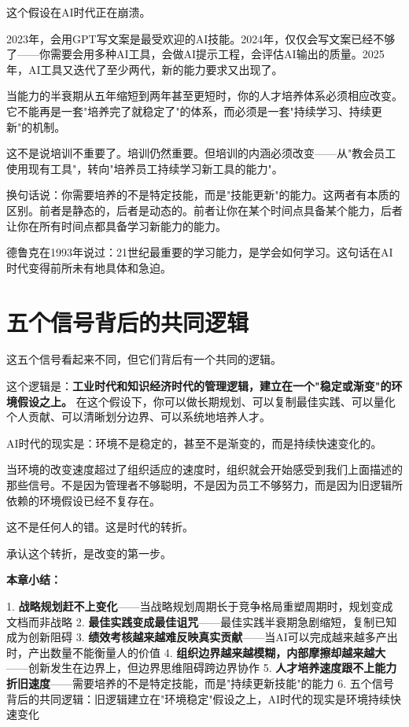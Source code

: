 这个假设在AI时代正在崩溃。

2023年，会用GPT写文案是最受欢迎的AI技能。2024年，仅仅会写文案已经不够了——你需要会用多种AI工具，会做AI提示工程，会评估AI输出的质量。2025年，AI工具又迭代了至少两代，新的能力要求又出现了。

当能力的半衰期从五年缩短到两年甚至更短时，你的人才培养体系必须相应改变。它不能再是一套"培养完了就稳定了"的体系，而必须是一套"持续学习、持续更新"的机制。

这不是说培训不重要了。培训仍然重要。但培训的内涵必须改变——从"教会员工使用现有工具"，转向"培养员工持续学习新工具的能力"。

换句话说：你需要培养的不是特定技能，而是"技能更新"的能力。这两者有本质的区别。前者是静态的，后者是动态的。前者让你在某个时间点具备某个能力，后者让你在所有时间点都具备学习新能力的能力。

德鲁克在1993年说过：21世纪最重要的学习能力，是学会如何学习。这句话在AI时代变得前所未有地具体和急迫。


\section{五个信号背后的共同逻辑}


这五个信号看起来不同，但它们背后有一个共同的逻辑。

这个逻辑是：\textbf{工业时代和知识经济时代的管理逻辑，建立在一个"稳定或渐变"的环境假设之上。} 在这个假设下，你可以做长期规划、可以复制最佳实践、可以量化个人贡献、可以清晰划分边界、可以系统地培养人才。

AI时代的现实是：环境不是稳定的，甚至不是渐变的，而是持续快速变化的。

当环境的改变速度超过了组织适应的速度时，组织就会开始感受到我们上面描述的那些信号。不是因为管理者不够聪明，不是因为员工不够努力，而是因为旧逻辑所依赖的环境假设已经不复存在。

这不是任何人的错。这是时代的转折。

承认这个转折，是改变的第一步。


\textbf{本章小结：}

1. \textbf{战略规划赶不上变化}——当战略规划周期长于竞争格局重塑周期时，规划变成文档而非战略
2. \textbf{最佳实践变成最佳诅咒}——最佳实践半衰期急剧缩短，复制已知成为创新阻碍
3. \textbf{绩效考核越来越难反映真实贡献}——当AI可以完成越来越多产出时，产出数量不能衡量人的价值
4. \textbf{组织边界越来越模糊，内部摩擦却越来越大}——创新发生在边界上，但边界思维阻碍跨边界协作
5. \textbf{人才培养速度跟不上能力折旧速度}——需要培养的不是特定技能，而是"持续更新技能"的能力
6. 五个信号背后的共同逻辑：旧逻辑建立在"环境稳定"假设之上，AI时代的现实是环境持续快速变化
